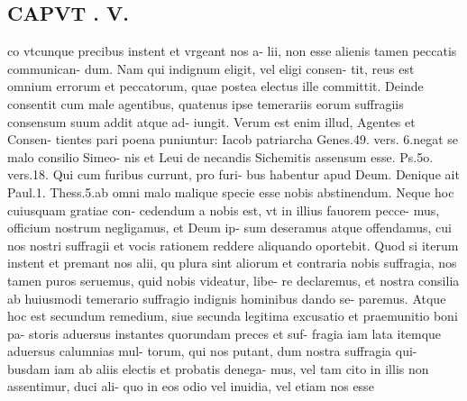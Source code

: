 \documentclass{article}
\begin{document}
\begin{pages}
\section*{CAPVT . V. }
\marginpar{[ p.339 ]}\pstart co vtcunque precibus instent et vrgeant nos a- lii, non esse alienis tamen peccatis communican- dum. Nam qui indignum eligit, vel eligi consen- tit, reus est omnium errorum et peccatorum, quae postea electus ille committit. Deinde consentit cum male agentibus, quatenus ipse temerariis eorum suffragiis consensum suum addit atque ad- iungit. Verum est enim illud, Agentes et Consen- tientes pari poena puniuntur: Iacob patriarcha Genes.49. vers. 6.negat se malo consilio Simeo- nis et Leui de necandis Sichemitis assensum esse. Ps.5o. vers.18. Qui cum furibus currunt, pro furi- bus habentur apud Deum. Denique ait Paul.1. Thess.5.ab omni malo malique specie esse nobis abstinendum. Neque hoc cuiusquam gratiae con- cedendum a nobis est, vt in illius fauorem pecce- mus, officium nostrum negligamus, et Deum ip- sum deseramus atque offendamus, cui nos nostri suffragii et vocis rationem reddere aliquando oportebit.  \pend\pstart Quod si iterum instent et premant nos alii, qu plura sint aliorum et contraria nobis suffragia, nos tamen puros seruemus, quid nobis videatur, libe- re declaremus, et nostra consilia ab huiusmodi temerario suffragio indignis hominibus dando se- paremus. Atque hoc est secundum remedium, siue secunda legitima excusatio et praemunitio boni pa- storis aduersus instantes quorundam preces et suf- fragia iam lata itemque aduersus calumnias mul- torum, qui nos putant, dum nostra suffragia qui- busdam iam ab aliis electis et probatis denega- mus, vel tam cito in illis non assentimur, duci ali- quo in eos odio vel inuidia, vel etiam nos esse  \pend

\end{pages}
\end{document}
